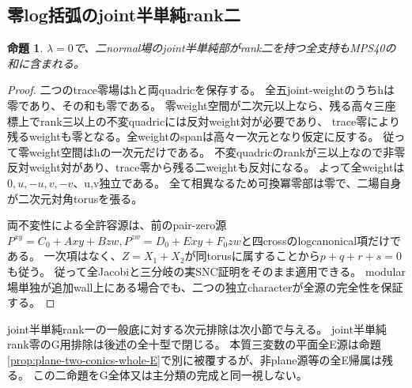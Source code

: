 \documentclass[a4paper,11pt]{ltjsarticle}
\newtheorem{proposition}{命題}[section]
\theoremstyle{definition}
\begin{document}
\subsection{零log括弧のjoint半単純rank二}
\begin{proposition}\label{prop:two-quadrics-zero-lambda-rank2}
$\lambda=0$で、二normal場のjoint半単純部がrank二を持つ全支持もMPS40の和に含まれる。
\end{proposition}
\begin{proof}
二つのtrace零場はhと両quadricを保存する。
全五joint-weightのうちhは零であり、その和も零である。
零weight空間が二次元以上なら、残る高々三座標上でrank三以上の不変quadricには反対weight対が必要であり、
trace零により残るweightも零となる。全weightのspanは高々一次元となり仮定に反する。
従って零weight空間はhの一次元だけである。
不変quadricのrankが三以上なので非零反対weight対があり、trace零から残る二weightも反対になる。
よって全weightは$0,u,-u,v,-v$、u,v独立である。
全て相異なるため可換冪零部は零で、二場自身が二次元対角torusを張る。

両不変性による全許容源は、前のpair-zero源
$P^{xy}=C_0+Axy+Bzw,P^{zw}=D_0+Exy+F_0zw$と四crossのlogcanonical項だけである。
一次項はなく、$Z=X_1+X_2$が同torusに属することから$p+q+r+s=0$も従う。
従って全Jacobiと三分岐の実SNC証明をそのまま適用できる。
modular場単独が追加wall上にある場合でも、二つの独立characterが全源の完全性を保証する。
\end{proof}
joint半単純rank一の一般底に対する次元排除は次小節で与える。
joint半単純rank零のG用排除は後述の全十型で閉じる。
本質三変数の平面全E源は命題\ref{prop:plane-two-conics-whole-E}で別に被覆するが、非plane源等の全E帰属は残る。
この二命題をG全体又は主分類の完成と同一視しない。
\end{document}
